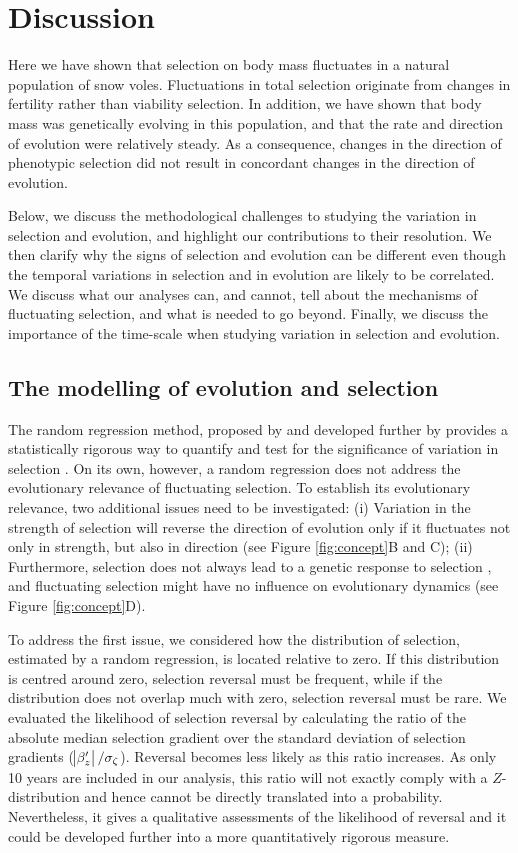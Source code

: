 \section*{Discussion}
Here we have shown that selection on body mass fluctuates in a natural population of snow voles. Fluctuations in total selection originate from changes in fertility rather than viability selection. 
In addition, we have shown that body mass was genetically evolving in this population, and that the rate and direction of evolution were relatively steady. As a consequence, changes in the direction of phenotypic selection did not result in concordant changes in the direction of evolution.

Below, we discuss the methodological challenges to studying the variation in selection and evolution, and highlight our contributions to their resolution. We then clarify why the signs of selection and evolution can be different even though the temporal variations in selection and in evolution are likely to be correlated. We discuss what our analyses can, and cannot, tell about the mechanisms of fluctuating selection, and what is needed to go beyond. 
Finally, we discuss the importance of the time-scale when studying variation in selection and evolution.

\subsection*{The modelling of evolution and selection}
The random regression method, proposed by \cite{Morrissey2012flusel} and developed further by \cite{Chevin2015b} provides a statistically rigorous way to quantify and test for the significance of variation in selection \parencite{Chevin2015b}. On its own, however, a random regression does not address the evolutionary relevance of fluctuating selection. To establish its evolutionary relevance, two additional issues need to be investigated: (i) Variation in the strength of selection will reverse the direction of evolution only if it fluctuates not only in strength, but also in direction (see Figure \ref{fig:concept}B and C); (ii) Furthermore, selection does not always lead to a genetic response to selection \parencite{Rausher1992, Morrissey2010, Merila2001}, and fluctuating selection might have no influence on evolutionary dynamics (see Figure \ref{fig:concept}D).

To address the first issue, we considered how the distribution of selection, estimated by a random regression, is located relative to zero. If this distribution is centred around zero, selection reversal must be frequent, while if the distribution does not overlap much with zero, selection reversal must be rare.
We evaluated the likelihood of selection reversal by calculating the ratio of the absolute median selection gradient over the standard deviation of selection gradients ($\abs{\beta_{z}^\prime}/\sigma_\zeta$). Reversal becomes less likely as this ratio increases.
As only 10 years are included in our analysis, this ratio will not exactly comply with a $Z$-distribution and hence cannot be directly translated into a probability. Nevertheless, it gives a qualitative assessments of the likelihood of reversal and it could be developed further into a more quantitatively rigorous measure.

